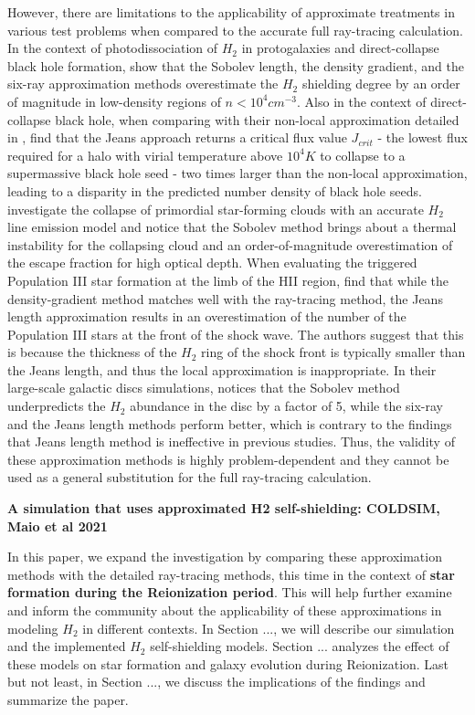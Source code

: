 \documentclass[linenumbers, twocolumn]{aastex631}
\begin{document}
However, there are limitations to the applicability of approximate treatments in various test problems when compared to the accurate full ray-tracing calculation. In the context of photodissociation of $H_{2}$ in protogalaxies and direct-collapse black hole formation, \cite{Wolcott-Green+2011} show that the Sobolev length, the density gradient, and the six-ray approximation methods overestimate the $H_{2}$ shielding degree by an order of magnitude in low-density regions of $n < 10^{4} cm^{-3}$. Also in the context of direct-collapse black hole, when comparing with their non-local approximation detailed in \cite{Hartwig+2015}, \cite{Hartwig+2015b} find that the Jeans approach returns a critical flux value $J_{crit}$ - the lowest flux required for a halo with virial temperature above $10^{4} K$ to collapse to a supermassive black hole seed - two times larger than the non-local approximation, leading to a disparity in the predicted number density of black hole seeds. \cite{Greif+2014} investigate the collapse of primordial star-forming clouds with an accurate $H_{2}$ line emission model and notice that the Sobolev method brings about a thermal instability for the collapsing cloud and an order-of-magnitude overestimation of the escape fraction for high optical depth. When evaluating the triggered Population III star formation at the limb of the HII region, \cite{Chiaki+2023a} find that while the density-gradient method matches well with the ray-tracing method, the Jeans length approximation results in an overestimation of the number of the Population III stars at the front of the shock wave. The authors suggest that this is because the thickness of the $H_{2}$ ring of the shock front is typically smaller than the Jeans length, and thus the local approximation is inappropriate. In their large-scale galactic discs simulations, \cite{Safranek-Shrader+2017} notices that the Sobolev method underpredicts the $H_{2}$ abundance in the disc by a factor of 5, while the six-ray and the Jeans length methods perform better, which is contrary to the findings that Jeans length method is ineffective in previous studies. Thus, the validity of these approximation methods is highly problem-dependent and they cannot be used as a general substitution for the full ray-tracing calculation. 


\textbf{A simulation that uses approximated H2 self-shielding: COLDSIM, Maio et al 2021}

In this paper, we expand the investigation by comparing these approximation methods with the detailed ray-tracing methods, this time in the context of \textbf{star formation during the Reionization period}. This will help further examine and inform the community about the applicability of these approximations in modeling $H_{2}$ in different contexts. In Section ..., we will describe our simulation and the implemented $H_{2}$ self-shielding models. Section ... analyzes the effect of these models on star formation and galaxy evolution during Reionization. Last but not least, in Section ..., we discuss the implications of the findings and summarize the paper. \\
\end{document}
